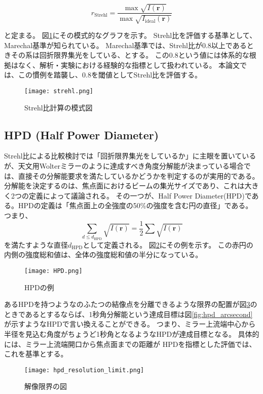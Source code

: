 \[
r_{\mathrm{Strehl}} = \frac{ \max{\sqrt{I(\mathbf{r})} } }{ \max{ \sqrt{I_{\mathrm{ideal}}( \mathbf{r} )} } }
\]

と定まる。
図\ref{fig:strehl_explanation}にその模式的なグラフを示す。
Strehl比を評価する基準として、Marechal基準\cite{BornWolf:1999:Book}が知られている。
Marechal基準では、Strehl比が0.8以上であるときその系は回折限界集光をしている、とする。
この0.8という値には体系的な根拠はなく、解析・実験における経験的な指標として扱われている。
本論文では、この慣例を踏襲し、0.8を閾値としてStrehl比を評価する。

\begin{figure}[h]
\centering
\texttt{[image: strehl.png]}
\caption{Strehl比計算の模式図}
\label{fig:strehl_explanation}
\end{figure}

\subsection{HPD (Half Power Diameter)}
\label{chap2_hpd}

Strehl比による比較検討では「回折限界集光をしているか」に主眼を置いているが、天文用Wolterミラーのように達成すべき角度分解能が決まっている場合では、直接その分解能要求を満たしているかどうかを判定するのが実用的である。
分解能を決定するのは、焦点面におけるビームの集光サイズであり、これは大きく2つの定義によって議論される。
その一つが、Half Power Diameter(HPD)である。HPDの定義は「焦点面上の全強度の50\%の強度を含む円の直径」である。つまり、
\[
    \sum_{d\leq d_{\mathrm{HPD}}} \sqrt{ I(\mathbf{r}) } = \frac{1}{2} \sum \sqrt{ I(\mathbf{r}) }
\]
を満たすような直径$d_{\mathrm{HPD}}$として定義される。
図\ref{fig:hpd_explanation}にその例を示す。
この赤円の内側の強度総和値は、全体の強度総和値の半分になっている。

\begin{figure}[!ht]
\centering
\texttt{[image: HPD.png]}
\caption{HPDの例}
\label{fig:hpd_explanation}
\end{figure}

あるHPDを持つようなのふたつの結像点を分離できるような限界の配置が図\ref{fig:hpd_resolution_limit}のときであるとするならば、1秒角分解能という達成目標は図\ref{fig:hpd_arcsecond}が示すようなHPDで言い換えることができる。
つまり、ミラー上流端中心から半径を見込む角度がちょうど1秒角となるようなHPDが達成目標となる。
具体的には、ミラー上流端開口から焦点面までの距離が
HPDを指標とした評価では、これを基準とする。

\begin{figure}[ht]
\centering
\texttt{[image: hpd\_resolution\_limit.png]}
\caption{解像限界の図}
\label{fig:hpd_resolution_limit}
\end{figure}

